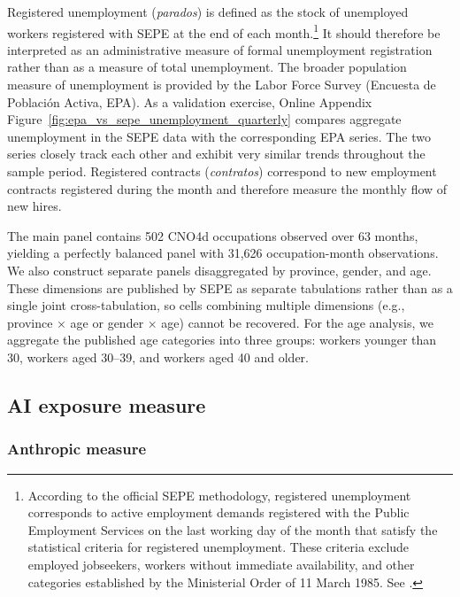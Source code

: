 Registered unemployment (\textit{parados}) is defined as the stock of unemployed workers registered with SEPE at the end of each month.\footnote{According to the official SEPE methodology, registered unemployment corresponds to active employment demands registered with the Public Employment Services on the last working day of the month that satisfy the statistical criteria for registered unemployment. These criteria exclude employed jobseekers, workers without immediate availability, and other categories established by the Ministerial Order of 11 March 1985. See \citet{mites_mlr_methodology}.} It should therefore be interpreted as an administrative measure of formal unemployment registration rather than as a measure of total unemployment. The broader population measure of unemployment is provided by the Labor Force Survey (Encuesta de Poblaci\'on Activa, EPA). As a validation exercise, Online Appendix Figure~\ref{fig:epa_vs_sepe_unemployment_quarterly} compares aggregate unemployment in the SEPE data with the corresponding EPA series. The two series closely track each other and exhibit very similar trends throughout the sample period. Registered contracts (\textit{contratos}) correspond to new employment contracts registered during the month and therefore measure the monthly flow of new hires.

The main panel contains 502 CNO4d occupations observed over 63 months, yielding a perfectly balanced panel with 31,626 occupation-month observations. We also construct separate panels disaggregated by province, gender, and age. These dimensions are published by SEPE as separate tabulations rather than as a single joint cross-tabulation, so cells combining multiple dimensions (e.g., province $\times$ age or gender $\times$ age) cannot be recovered. For the age analysis, we aggregate the published age categories into three groups: workers younger than 30, workers aged 30--39, and workers aged 40 and older.


\subsection{AI exposure measure}

\subsubsection{Anthropic measure}

